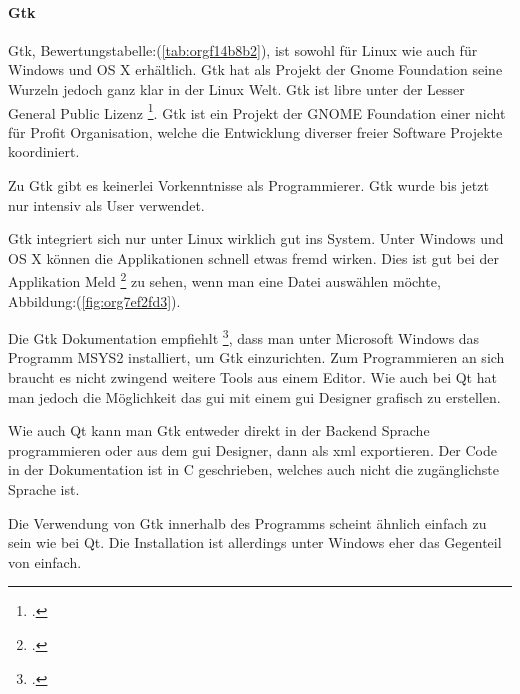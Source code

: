 \newpage
\paragraph{Gtk}
\label{sec:orgbac0846}

Gtk, Bewertungstabelle:(\ref{tab:orgf14b8b2}), ist sowohl für Linux wie auch
für Windows und OS X erhältlich. Gtk hat als Projekt der Gnome Foundation seine
Wurzeln jedoch ganz klar in der Linux Welt. Gtk ist \gls{libre} unter der
Lesser General Public Lizenz \footcite{gtklicense}. Gtk ist ein Projekt der
GNOME Foundation einer nicht für Profit Organisation, welche die Entwicklung
diverser freier Software Projekte koordiniert.

Zu Gtk gibt es keinerlei Vorkenntnisse als Programmierer. Gtk wurde bis jetzt
nur intensiv als User verwendet.

Gtk integriert sich nur unter Linux wirklich gut ins System. Unter Windows und
OS X können die Applikationen schnell etwas fremd wirken. Dies ist gut bei der
Applikation Meld \footcite{meld} zu sehen, wenn man eine Datei auswählen möchte,
Abbildung:(\ref{fig:org7ef2fd3}).

Die Gtk Dokumentation empfiehlt \footcite{gtk_setup}, dass man unter Microsoft
Windows das Programm MSYS2 installiert, um Gtk einzurichten. Zum Programmieren
an sich braucht es nicht zwingend weitere Tools aus einem Editor. Wie auch bei
Qt hat man jedoch die Möglichkeit das \gls{gui} mit einem \gls{gui} Designer
grafisch zu erstellen.

Wie auch Qt kann man Gtk entweder direkt in der Backend Sprache programmieren
oder aus dem \gls{gui} Designer, dann als \gls{xml} exportieren. Der Code in der
Dokumentation ist in C geschrieben, welches auch nicht die zugänglichste
Sprache ist.

Die Verwendung von Gtk innerhalb des Programms scheint ähnlich einfach zu sein
wie bei Qt. Die Installation ist allerdings unter Windows eher das Gegenteil
von einfach.

